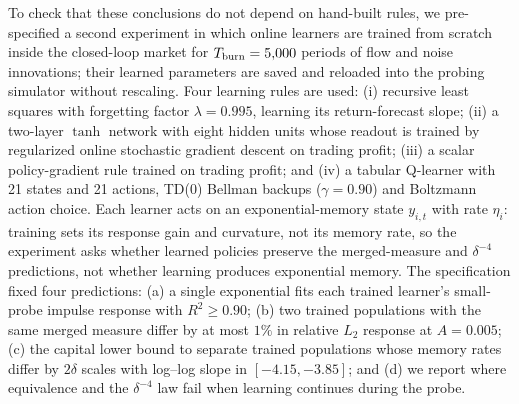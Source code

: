 \documentclass[12pt]{article}
\theoremstyle{definition}
\theoremstyle{remark}
\begin{document}
To check that these conclusions do not depend on hand-built rules, we pre-specified a second experiment in which online learners are trained from scratch inside the closed-loop market for $T_{\rm burn}=5{,}000$ periods of flow and noise innovations; their learned parameters are saved and reloaded into the probing simulator without rescaling. Four learning rules are used: (i) recursive least squares with forgetting factor $\lambda=0.995$, learning its return-forecast slope; (ii) a two-layer $\tanh$ network with eight hidden units whose readout is trained by regularized online stochastic gradient descent on trading profit; (iii) a scalar policy-gradient rule trained on trading profit; and (iv) a tabular Q-learner with 21 states and 21 actions, TD(0) Bellman backups ($\gamma=0.90$) and Boltzmann action choice. Each learner acts on an exponential-memory state $y_{i,t}$ with rate $\eta_i$: training sets its response gain and curvature, not its memory rate, so the experiment asks whether learned policies preserve the merged-measure and $\delta^{-4}$ predictions, not whether learning produces exponential memory. The specification fixed four predictions: (a) a single exponential fits each trained learner's small-probe impulse response with $R^2\ge0.90$; (b) two trained populations with the same merged measure differ by at most $1\%$ in relative $L_2$ response at $A=0.005$; (c) the capital lower bound to separate trained populations whose memory rates differ by $2\delta$ scales with log--log slope in $[-4.15,-3.85]$; and (d) we report where equivalence and the $\delta^{-4}$ law fail when learning continues during the probe.
\end{document}

